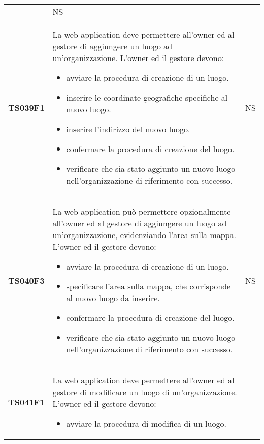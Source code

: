 \documentclass[../piano-di-qualifica.tex]{subfiles}
\begin{document}
\begin{centering}
\begin{longtable}[H]{>{\centering\bfseries}m{3cm} >{}p{10cm} >{\centering\arraybackslash}m{3cm}}
\begin{itemize}
                      \end{itemize}
                    & NS \\
        TS039F1     & La web application deve permettere all'owner ed al gestore di aggiungere un luogo ad un'organizzazione. \newline
                      L'owner ed il gestore devono:
                      \begin{itemize}
                        \item avviare la procedura di creazione di un luogo.
                        \item inserire le coordinate geografiche specifiche al nuovo luogo.
                        \item inserire l'indirizzo del nuovo luogo.
                        \item confermare la procedura di creazione del luogo.
                        \item verificare che sia stato aggiunto un nuovo luogo nell'organizzazione di riferimento con successo.
                      \end{itemize}
                    & NS \\
        TS040F3     & La web application può permettere opzionalmente all'owner ed al gestore di aggiungere un luogo ad un'organizzazione, evidenziando l'area sulla mappa. \newline
                      L'owner ed il gestore devono:
                      \begin{itemize}
                        \item avviare la procedura di creazione di un luogo.
                        \item specificare l'area sulla mappa, che corrisponde al nuovo luogo da inserire.
                        \item confermare la procedura di creazione del luogo.
                        \item verificare che sia stato aggiunto un nuovo luogo nell'organizzazione di riferimento con successo.
                      \end{itemize}
                    & NS \\
        TS041F1     & La web application deve permettere all'owner ed al gestore di modificare un luogo di un'organizzazione. \newline
                    L'owner ed il gestore devono:
                      \begin{itemize}
                        \item avviare la procedura di modifica di un luogo.

\end{itemize}
\end{longtable}
\end{centering}
\end{document}
